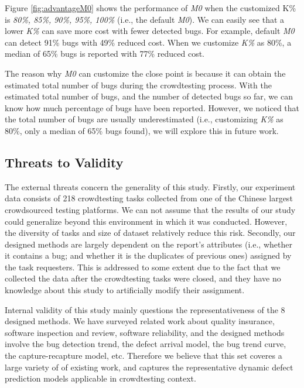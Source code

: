 \documentclass[sigconf,review, anonymous]{acmart}
\begin{document}
Figure \ref{fig:advantageM0} shows the performance of \textit{M0} when the customized {K\%} is \textit{80\%, 85\%, 90\%, 95\%, 100\%} (i.e., the default \textit{M0}).
We can easily see that a lower \textit{K\%} can save more cost with fewer detected bugs.
For example, default \textit{M0} can detect 91\% bugs with 49\% reduced cost.
When we customize \textit{K\%} as 80\%, a median of 65\% bugs is reported with 77\% reduced cost.

The reason why \textit{M0} can customize the close point is because it can obtain the estimated total number of bugs during the crowdtesting process.
With the estimated total number of bugs, and the number of detected bugs so far, we can know how much percentage of bugs have been reported.
However, we noticed that the total number of bugs are usually underestimated (i.e., customizing \textit{K\%} as 80\%, only a median of 65\% bugs found), we will explore this in future work. 




\subsection{Threats to Validity}
\label{subsec:dis_threats}


The external threats concern the generality of this study.
Firstly, our experiment data consists of 218 crowdtesting tasks collected from one of the Chinese largest crowdsourced testing platforms.
We can not assume that the results of our study could generalize beyond this environment in which it was conducted.
However, the diversity of tasks and size of dataset relatively reduce this risk. 
Secondly, our designed methods are largely dependent on the report's attributes (i.e., whether it contains a bug; and whether it is the duplicates of previous ones) assigned by the task requesters.
This is addressed to some extent due to the fact that we collected the data after the crowdtesting tasks were closed, and they have no knowledge about this study to artificially modify their assignment.


Internal validity of this study mainly questions the representativeness of the 8 designed methods.
We have surveyed related work about quality insurance, software inspection and review, software reliability, and the designed methods involve the bug detection trend, the defect arrival model, the bug trend curve, the capture-recapture model, etc. Therefore we believe that this set coveres a large variety of of existing work, and captures the representative dynamic defect prediction models applicable in crowdtesting context. 
\end{document}
